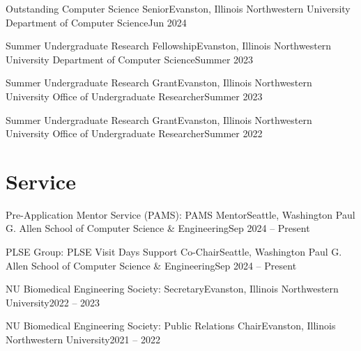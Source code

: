 \documentclass{cv}
\begin{document}
\resumeSubheading
{Outstanding Computer Science Senior}{Evanston, Illinois}
{Northwestern University Department of Computer Science}{Jun 2024}

\resumeSubheading
{Summer Undergraduate Research Fellowship}{Evanston, Illinois}
{Northwestern University Department of Computer Science}{Summer 2023}

\resumeSubheading
{Summer Undergraduate Research Grant}{Evanston, Illinois}
{Northwestern University Office of Undergraduate Researcher}{Summer 2023}

\resumeSubheading
{Summer Undergraduate Research Grant}{Evanston, Illinois}
{Northwestern University Office of Undergraduate Researcher}{Summer 2022}

\resumeSubHeadingListEnd


\section{Service}
\vspace{3pt}
\resumeSubHeadingListStart

\resumeSubheading
{Pre-Application Mentor Service (PAMS): \textnormal{PAMS Mentor}}{Seattle, Washington}
{Paul G. Allen School of Computer Science \& Engineering}{Sep 2024 – Present}

\resumeSubheading
{PLSE Group: \textnormal{PLSE Visit Days Support Co-Chair}}{Seattle, Washington}
{Paul G. Allen School of Computer Science \& Engineering}{Sep 2024 – Present}

\resumeSubheading
{NU Biomedical Engineering Society: \textnormal{Secretary}}{Evanston, Illinois}
{Northwestern University}{2022 – 2023}

\resumeSubheading
{NU Biomedical Engineering Society: \textnormal{Public Relations Chair}}{Evanston, Illinois}
{Northwestern University}{2021 – 2022}

\resumeSubHeadingListEnd
\end{document}
